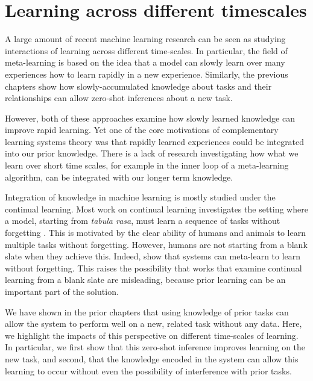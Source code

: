 \chapter{Learning across different timescales} \label{chapter:timescales}

A large amount of recent machine learning research can be seen as studying interactions of learning across different time-scales. In particular, the field of meta-learning is based on the idea that a model can slowly learn over many experiences how to learn rapidly in a new experience. Similarly, the previous chapters show how slowly-accumulated knowledge about tasks and their relationships can allow zero-shot inferences about a new task. \par 

However, both of these approaches examine how slowly learned knowledge can improve rapid learning. Yet one of the core motivations of complementary learning systems theory was that rapidly learned experiences could be integrated into our prior knowledge. There is a lack of research investigating how what we learn over short time scales, for example in the inner loop of a meta-learning algorithm, can be integrated with our longer term knowledge. \par 

Integration of knowledge in machine learning is mostly studied under the continual learning. Most work on continual learning investigates the setting where a model, starting from \emph{tabula rasa}, must learn a sequence of tasks without forgetting \citep{Ven2018, Atkinson2018}. This is motivated by the clear ability of humans and animals to learn multiple tasks without forgetting. However, humans are not starting from a blank slate when they achieve this. Indeed, \citep{Velez2017} show that systems can meta-learn to learn without forgetting. This raises the possibility that works that examine continual learning from a blank slate are misleading, because prior learning can be an important part of the solution. \par 

We have shown in the prior chapters that using knowledge of prior tasks can allow the system to perform well on a new, related task without any data. Here, we highlight the impacts of this perspective on different time-scales of learning. In particular, we first show that this zero-shot inference improves learning on the new task, and second, that the knowledge encoded in the system can allow this learning to occur without even the possibility of interference with prior tasks. \par  

